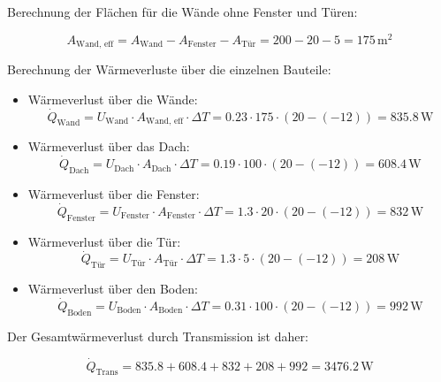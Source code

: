 \documentclass{article}
\begin{document}
Berechnung der Flächen für die Wände ohne Fenster und Türen:

\begin{equation}
A_\text{Wand, eff} = A_\text{Wand} - A_\text{Fenster} - A_\text{Tür} = 200 - 20 - 5 = 175 \, \text{m}^2
\end{equation}

Berechnung der Wärmeverluste über die einzelnen Bauteile:

\begin{itemize}
    \item Wärmeverlust über die Wände:
    \begin{equation}
    \dot{Q}_\text{Wand} = U_\text{Wand} \cdot A_\text{Wand, eff} \cdot \Delta T = 0.23 \cdot 175 \cdot (20 - (-12)) = 835.8 \, \text{W}
    \end{equation}
    
    \item Wärmeverlust über das Dach:
    \begin{equation}
    \dot{Q}_\text{Dach} = U_\text{Dach} \cdot A_\text{Dach} \cdot \Delta T = 0.19 \cdot 100 \cdot (20 - (-12)) = 608.4 \, \text{W}
    \end{equation}
    
    \item Wärmeverlust über die Fenster:
    \begin{equation}
    \dot{Q}_\text{Fenster} = U_\text{Fenster} \cdot A_\text{Fenster} \cdot \Delta T = 1.3 \cdot 20 \cdot (20 - (-12)) = 832 \, \text{W}
    \end{equation}
    
    \item Wärmeverlust über die Tür:
    \begin{equation}
    \dot{Q}_\text{Tür} = U_\text{Tür} \cdot A_\text{Tür} \cdot \Delta T = 1.3 \cdot 5 \cdot (20 - (-12)) = 208 \, \text{W}
    \end{equation}
    
    \item Wärmeverlust über den Boden:
    \begin{equation}
    \dot{Q}_\text{Boden} = U_\text{Boden} \cdot A_\text{Boden} \cdot \Delta T = 0.31 \cdot 100 \cdot (20 - (-12)) = 992 \, \text{W}
    \end{equation}
\end{itemize}

Der Gesamtwärmeverlust durch Transmission ist daher:

\begin{equation}
\dot{Q}_\text{Trans} = 835.8 + 608.4 + 832 + 208 + 992 = 3476.2 \, \text{W}
\end{equation}
\end{document}
